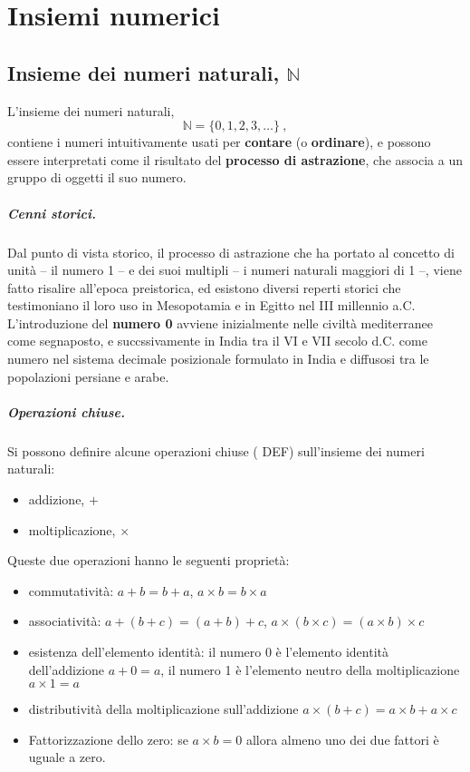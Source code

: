 \chapter{Insiemi numerici}
\section{Insieme dei numeri naturali, $\mathbb{N}$}
L'insieme dei numeri naturali,
\begin{equation}
    \mathbb{N} = \{ 0, 1, 2, 3, \dots \} \ ,
\end{equation}
contiene i numeri intuitivamente usati per \textbf{contare} (o \textbf{ordinare}), e possono essere interpretati come il risultato del \textbf{processo di astrazione}, che associa a un gruppo di oggetti il suo numero.

\paragraph{Cenni storici.} Dal punto di vista storico, il processo di astrazione che ha portato al concetto di unità -- il numero 1 -- e dei suoi multipli -- i numeri naturali maggiori di 1 --, viene fatto risalire all'epoca preistorica, ed esistono diversi reperti storici che testimoniano il loro uso in Mesopotamia e in Egitto nel III millennio a.C.
L'introduzione del \textbf{numero 0} avviene inizialmente nelle civiltà mediterranee come segnaposto, e succssivamente in India tra il VI e VII secolo d.C. come numero nel sistema decimale posizionale formulato in India e diffusosi tra le popolazioni persiane e arabe.


\paragraph{Operazioni chiuse.}
Si possono definire alcune operazioni chiuse ({\color{red} DEF}) sull'insieme dei numeri naturali:
\begin{itemize}
    \item addizione, $+$
    \item moltiplicazione, $\times$
\end{itemize}
Queste due operazioni hanno le seguenti proprietà:
\begin{itemize}
    \item commutatività: $a+b=b+a$, $a \times b = b \times a$
    \item associatività: $a+(b+c)=(a+b)+c$, $a \times (b \times c) =(a\times b) \times c$
    \item esistenza dell'elemento identità: il numero 0 è l'elemento identità dell'addizione $a+0=a$, il numero 1 è l'elemento neutro della moltiplicazione $a \times 1 = a$
    \item distributività della moltiplicazione sull'addizione $a\times(b+c)=a\times b+a\times c$
    \item {\color{red} Fattorizzazione dello zero: se $a \times b = 0$ allora almeno uno dei due fattori è uguale a zero.}
\end{itemize}

